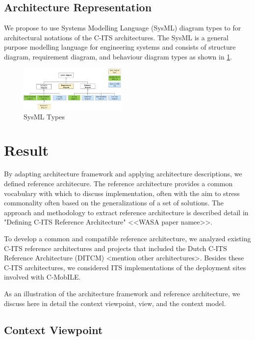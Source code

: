 \documentclass[letterpaper, 10 pt, conference]{ieeeconf}  %
\begin{document}
\subsection{Architecture Representation}
We propose to use Systems Modelling Language (SysML) diagram types to for architectural notations of the C-ITS architectures. The SysML is a general purpose modelling language for engineering systems and consists of structure diagram, requirement diagram, and behaviour diagram types as shown in \ref{sysml}.

\begin{figure}[ht!]
	\centering
	\includegraphics[width=0.47\textwidth]{sysml}
	\caption{SysML Types}
	\label{sysml}
	\centering
\end{figure}

\section{Result}

By adapting architecture framework and applying architecture descriptions, we defined reference architecure. The reference architecture provides a common vocabulary with which to discuss implementation, often with the aim to stress commonality often based on the generalizations of a set of solutions. The approach and methodology to extract reference architecture is described detail in "Defining C-ITS Reference Architecture" \cite{d31} <<WASA paper namee>>.

To develop a common and compatible reference architecture, we analyzed existing C-ITS reference architectures and projects that included the Dutch C-ITS Reference Architecture (DITCM) \cite{dtcim} <mention other architectures>. Besides these C-ITS architectures, we considered ITS implementations of the deployment sites involved with C-MobILE.

As an illustration of the architecture framework and reference architecture, we discuss here in detail the context viewpoint, view, and the context model.


\subsection{Context Viewpoint}
\end{document}
